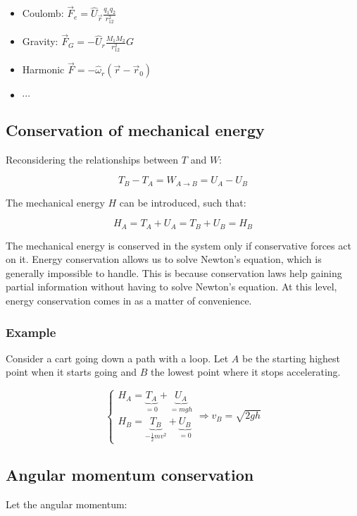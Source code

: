       \begin{multicols}{2}
        \begin{itemize}
          \item Coulomb: $\vec{F}_e = \hat{U}_{\vec{r}}\frac{q_1q_2}{r_{12}^2}$
          \item Gravity: $\vec{F}_G = -\hat{U}_r\frac{M_1M_2}{r_{12}^2}G$
          \item Harmonic $\vec{F} = -\hat{\omega}_r(\vec{r}-\vec{r}_0)$
          \item $\cdots$
        \end{itemize}
      \end{multicols}

  \subsection{Conservation of mechanical energy}
  Reconsidering the relationships between $T$ and $W$:

  $$T_B-T_A = W_{A\rightarrow B} = U_A-U_B$$

  The mechanical energy $H$ can be introduced, such that:

  $$H_A = T_A+U_A = T_B+U_B = H_B$$

  The mechanical energy is conserved in the system only if conservative forces act on it.
  Energy conservation allows us to solve Newton's equation, which is generally impossible to handle.
  This is because conservation laws help gaining partial information without having to solve Newton's equation.
  At this level, energy conservation comes in as a matter of convenience.

    \subsubsection{Example}
    Consider a cart going down a path with a loop.
    Let $A$ be the starting highest point when it starts going and $B$ the lowest point where it stops accelerating.

    $$\begin{cases}H_A = \underbrace{T_A}_{=0}+\underbrace{U_A}_{=mgh}\\
    H_B = \underbrace{T_B}_{-\frac{1}{2}mv^2}+\underbrace{U_B}_{=0}\end{cases}
    \Rightarrow v_B = \sqrt{2gh}$$

  \subsection{Angular momentum conservation}
  Let the angular momentum:

